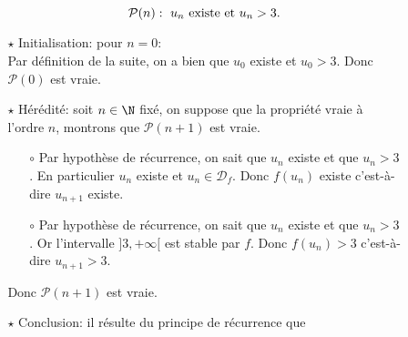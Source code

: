 \begin{correction}
\begin{enumerate}
\begin{enumerate}
\begin{itemize}
$$\mathcal{P}(n):\ u_n\ \hbox{existe et}\ u_n>3.$$
\item[$\star$] Initialisation: pour $n=0$:\\
\noindent Par d\'efinition de la suite, on a bien que $u_0$ existe et $u_0>3$. Donc $\mathcal{P}(0)$ est vraie.
\item[$\star$] H\'er\'edit\'e: soit $n\in\N$ fix\'e, on suppose que la propri\'et\'e vraie \`{a} l'ordre $n$, montrons que $\mathcal{P}(n+1)$ est vraie.
\begin{itemize}
\item[$\circ$] Par hypoth\`{e}se de r\'ecurrence, on sait que $u_n$ existe et que $u_n>3$. En particulier $u_n$ existe et $u_n\in\mathcal{D}_f$. Donc $f(u_n)$ existe c'est-\`{a}-dire $u_{n+1}$ existe.
\item[$\circ$] Par hypoth\`{e}se de r\'ecurrence, on sait que $u_n$ existe et que $u_n>3$. Or l'intervalle $\rbrack 3,+\infty\lbrack$ est stable par $f$. Donc $f(u_n)>3$ c'est-\`{a}-dire $u_{n+1}>3$.
\end{itemize}
Donc $\mathcal{P}(n+1)$ est vraie.
\item[$\star$] Conclusion: il r\'esulte du principe de r\'ecurrence que


\end{itemize}
\end{enumerate}
\end{enumerate}
\end{correction}
